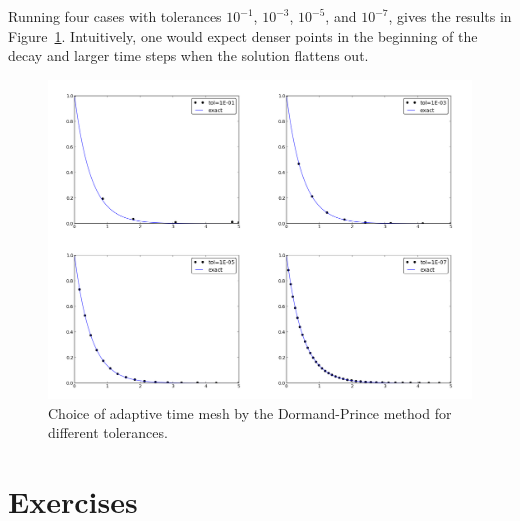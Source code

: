 \documentclass[%
oneside,                 %
final,                   %
10pt]{article}
\begin{document}
Running four cases with tolerances $10^{-1}$, $10^{-3}$, $10^{-5}$,
and $10^{-7}$, gives the results in Figure~\ref{decay:odespy:fig2}.
Intuitively, one would expect denser points in the beginning of
the decay and larger time steps when the solution flattens out.


\begin{figure}[!ht]  %
  \centerline{\includegraphics[width=1.2\linewidth]{fig-genz/decay_DormandPrince_adaptivity.png}}
  \caption{
  Choice of adaptive time mesh by the Dormand-Prince method for different tolerances. \label{decay:odespy:fig2}
  }
\end{figure}




\section{Exercises}
\end{document}
